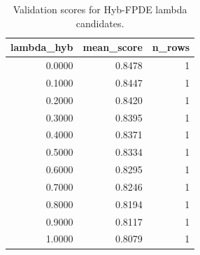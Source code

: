 \begin{table}[t]
\caption{Validation scores for Hyb-FPDE lambda candidates.}
\label{tab:lambda_distribution_computed}
\centering
\begin{tabular}{rrr}
\toprule
lambda\_hyb & mean\_score & n\_rows \\
\midrule
0.0000 & 0.8478 & 1 \\
0.1000 & 0.8447 & 1 \\
0.2000 & 0.8420 & 1 \\
0.3000 & 0.8395 & 1 \\
0.4000 & 0.8371 & 1 \\
0.5000 & 0.8334 & 1 \\
0.6000 & 0.8295 & 1 \\
0.7000 & 0.8246 & 1 \\
0.8000 & 0.8194 & 1 \\
0.9000 & 0.8117 & 1 \\
1.0000 & 0.8079 & 1 \\
\bottomrule
\end{tabular}

\end{table}
